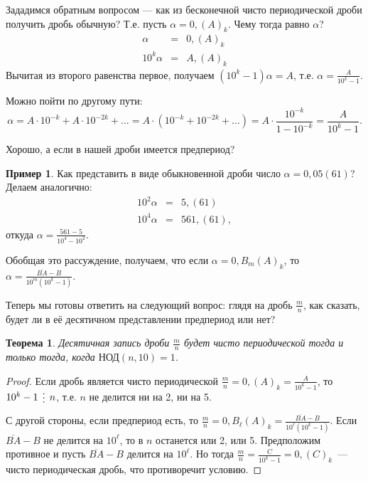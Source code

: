 \documentclass[a4paper,14pt]{extarticle}
\newcommand{\divby}{\mathrel{\smash{\lower.5ex\hbox{$\,\vdots\,$}}}}
\theoremstyle{plain}
\newtheorem{theorem}{Теорема}
\theoremstyle{definition}
\newtheorem{example}{Пример}
\theoremstyle{remark}
\begin{document}
Зададимся обратным вопросом --- как из бесконечной чисто периодической дроби получить 
дробь обычную? Т.е. пусть $\alpha=0{,}(A)_k$. Чему тогда равно $\alpha$?
\begin{eqnarray*}
\alpha &=&0{,}(A)_k \\
10^k\alpha &=&A{,}(A)_k
\end{eqnarray*}
Вычитая из второго равенства первое, получаем $(10^k-1)\alpha=A$, т.е. $\alpha=\frac{A}{10^k-1}$.

Можно пойти по другому пути: 
\[
\alpha=A\cdot 10^{-k}+A\cdot 10^{-2k}+\ldots=A\cdot (10^{-k}+10^{-2k}+\ldots)=A\cdot \frac{10^{-k}}{1-10^{-k}}=\frac{A}{10^k-1}. 
\]

Хорошо, а если в нашей дроби имеется предпериод?

\begin{example}
Как представить в виде обыкновенной дроби число $\alpha=0{,}05(61)$?
Делаем аналогично:
\begin{eqnarray*}
10^2\alpha &=& 5{,}(61) \\
10^4\alpha &=& 561{,}(61),
\end{eqnarray*}
откуда $\alpha=\frac{561-5}{10^4-10^2}$.
\end{example}

Обобщая это рассуждение, получаем, что если $\alpha=0{,}B_m(A)_k$, то $\alpha=\frac{\overline{BA}-B}{10^m(10^k-1)}$.

Теперь мы готовы ответить на следующий вопрос: глядя на дробь $\frac{m}{n}$, как сказать, будет ли в её десятичном
представлении предпериод или нет?

\begin{theorem}
Десятичная запись дроби $\frac{m}{n}$ будет чисто периодической тогда и только тогда, когда $\text{НОД}(n,10)=1$.
\end{theorem}

\begin{proof}
Если дробь является чисто периодической $\frac{m}{n}=0{,}(A)_k=\frac{A}{10^k-1}$, то $10^k-1\divby n$,
т.е. $n$ не делится ни на 2, ни на 5.

С другой стороны, если предпериод есть, то $\frac{m}{n}=0{,}B_\ell(A)_k=\frac{\overline{BA}-B}{10^\ell(10^k-1)}$.
Если $\overline{BA}-B$ не делится на $10^\ell$, то в $n$ останется или 2, или 5. Предположим противное и
пусть $\overline{BA}-B$ делится на $10^\ell$. Но тогда $\frac{m}{n}=\frac{C}{10^k-1}=0{,}(C)_k$~--- чисто
периодическая дробь, что противоречит условию. 
\end{proof}
\end{document}
